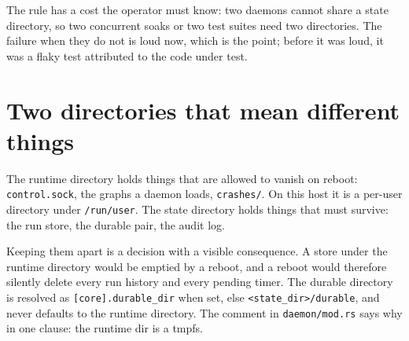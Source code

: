 \begin{center}
\end{center}

The rule has a cost the operator must know: two daemons cannot share a state directory, so two
concurrent soaks or two test suites need two directories. The failure when they do not is loud
now, which is the point; before it was loud, it was a flaky test attributed to the code under
test.

\section{Two directories that mean different things}

The runtime directory holds things that are allowed to vanish on reboot:
\texttt{control.sock}, the graphs a daemon loads, \texttt{crashes/}. On this host it is a
per-user directory under \texttt{/run/user}. The state directory holds things that must
survive: the run store, the durable pair, the audit log.

Keeping them apart is a decision with a visible consequence. A store under the runtime
directory would be emptied by a reboot, and a reboot would therefore silently delete every run
history and every pending timer. The durable directory is resolved as
\texttt{[core].durable\_dir} when set, else \texttt{<state\_dir>/durable}, and never defaults
to the runtime directory. The comment in \texttt{daemon/mod.rs} says why in one clause: the
runtime dir is a tmpfs.

